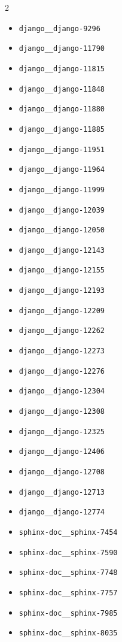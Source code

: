 \documentclass{article}
\begin{document}
\begin{multicols}{2}
\begin{itemize}
  \item \texttt{django\_\_django-9296}
  \item \texttt{django\_\_django-11790}
  \item \texttt{django\_\_django-11815}
  \item \texttt{django\_\_django-11848}
  \item \texttt{django\_\_django-11880}
  \item \texttt{django\_\_django-11885}
  \item \texttt{django\_\_django-11951}
  \item \texttt{django\_\_django-11964}
  \item \texttt{django\_\_django-11999}
  \item \texttt{django\_\_django-12039}
  \item \texttt{django\_\_django-12050}
  \item \texttt{django\_\_django-12143}
  \item \texttt{django\_\_django-12155}
  \item \texttt{django\_\_django-12193}
  \item \texttt{django\_\_django-12209}
  \item \texttt{django\_\_django-12262}
  \item \texttt{django\_\_django-12273}
  \item \texttt{django\_\_django-12276}
  \item \texttt{django\_\_django-12304}
  \item \texttt{django\_\_django-12308}
  \item \texttt{django\_\_django-12325}
  \item \texttt{django\_\_django-12406}
  \item \texttt{django\_\_django-12708}
  \item \texttt{django\_\_django-12713}
  \item \texttt{django\_\_django-12774}
  \item \texttt{sphinx-doc\_\_sphinx-7454}
  \item \texttt{sphinx-doc\_\_sphinx-7590}
  \item \texttt{sphinx-doc\_\_sphinx-7748}
  \item \texttt{sphinx-doc\_\_sphinx-7757}
  \item \texttt{sphinx-doc\_\_sphinx-7985}
  \item \texttt{sphinx-doc\_\_sphinx-8035}

\end{itemize}
\end{multicols}
\end{document}
